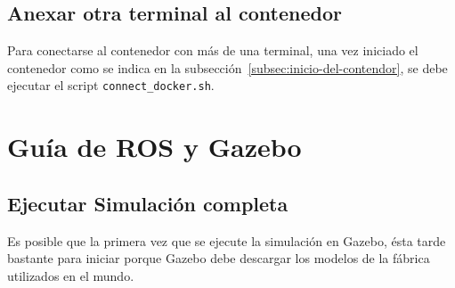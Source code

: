 \documentclass[12pt, a4paper]{report}
\begin{document}
			\subsection{Anexar otra terminal al contenedor}
				Para conectarse al contenedor con más de una terminal, una vez iniciado el contenedor como se indica en la subsección~\ref{subsec:inicio-del-contendor}, se debe ejecutar el script \texttt{connect\_docker.sh}.
		\section{Guía de ROS y Gazebo}
			\subsection{Ejecutar Simulación completa}
				Es posible que la primera vez que se ejecute la simulación en Gazebo, ésta tarde bastante para iniciar porque Gazebo debe descargar los modelos de la fábrica utilizados en el mundo.
\end{document}
